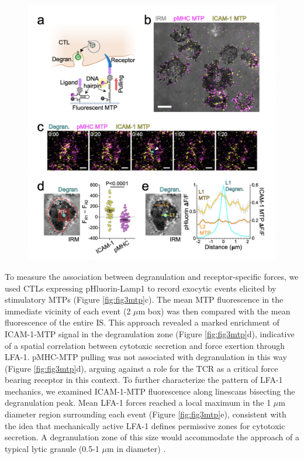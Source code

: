 \begin{figure}[h!]
	\ContinuedFloat
    \centering
    \captionsetup{labelformat=adja-page}
    \includegraphics[width=\textwidth]{../figures/chapter3/fig3mtp.png}
    \caption[]{}
\end{figure}

To measure the association between degranulation and receptor-specific forces, we used CTLs expressing pHluorin-Lamp1 to record exocytic events elicited by stimulatory MTPs (Figure \ref{fig:fig3mtp}c). The mean MTP fluorescence in the immediate vicinity of each event (2 $\mu$m box) was then compared with the mean fluorescence of the entire IS. This approach revealed a marked enrichment of ICAM-1-MTP signal in the degranulation zone (Figure \ref{fig:fig3mtp}d), indicative of a spatial correlation between cytotoxic secretion and force exertion through LFA-1. pMHC-MTP pulling was not associated with degranulation in this way (Figure \ref{fig:fig3mtp}d), arguing against a role for the TCR as a critical force bearing receptor in this context. To further characterize the pattern of LFA-1 mechanics, we examined ICAM-1-MTP fluorescence along linescans bisecting the degranulation peak. Mean LFA-1 forces reached a local maximum in the 1 $\mu$m diameter region surrounding each event (Figure \ref{fig:fig3mtp}e), consistent with the idea that mechanically active LFA-1 defines permissive zones for cytotoxic secretion. A degranulation zone of this size would accommodate the approach of a typical lytic granule (0.5-1 $\mu$m in diameter) \cite{Burkhardt1990}.


